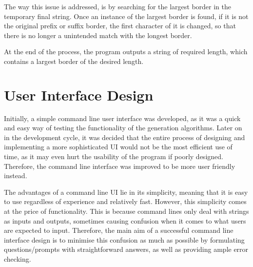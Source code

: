 \documentclass{l4proj}
\begin{document}
The way this issue is addressed, is by searching for the largest border in the temporary final string. Once an instance of the largest border is found, if it is not the original prefix or suffix border, the first character of it is changed, so that there is no longer a unintended match with the longest border.

At the end of the process, the program outputs a string of required length, which contains a largest border of the desired length.

\section{User Interface Design}

Initially, a simple command line user interface was developed, as it was a quick and easy way of testing the functionality of the generation algorithms. Later on in the development cycle, it was decided that the entire process of designing and implementing a more sophisticated UI would not be the most efficient use of time, as it may even hurt the usability of the program if poorly designed. Therefore, the command line interface was improved to be more user friendly instead.

The advantages of a command line UI lie in its simplicity, meaning that it is easy to use regardless of experience and relatively fast. However, this simplicity comes at the price of functionality. This is because command lines only deal with strings as inputs and outputs, sometimes causing confusion when it comes to what users are expected to input. Therefore, the main aim of a successful command line interface design is to minimise this confusion as much as possible by formulating questions/prompts with straightforward answers, as well as providing ample error checking.
\end{document}
